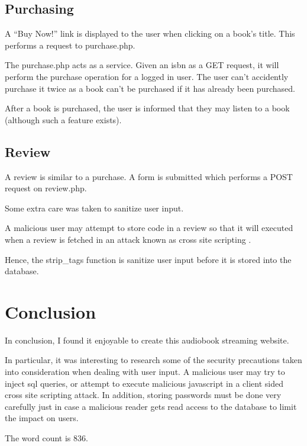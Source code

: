 \documentclass{article}
\begin{document}
\subsection{Purchasing}

A ``Buy Now!'' link is displayed to the user when clicking on a book's title. This performs a request to purchase.php.

The purchase.php acts as a service. Given an isbn as a GET request, it will perform the purchase operation for a logged in user. The user can't accidently purchase it twice as a book can't be purchased if it has already been purchased.

After a book is purchased, the user is informed that they may listen to a book (although such a feature exists).

\subsection{Review}

A review is similar to a purchase. A form is submitted which performs a POST request on review.php.

Some extra care was taken to sanitize user input.

A malicious user may attempt to store code in a review so that it will executed when a review is fetched in an attack known as cross site scripting \cite{owasp-xss}.

Hence, the strip\_tags function is sanitize user input before it is stored into the database.

\section{Conclusion}

In conclusion, I found it enjoyable to create this audiobook streaming website.

In particular, it was interesting to research some of the security precautions taken into consideration when dealing with user input. A malicious user may try to inject sql queries, or attempt to execute malicious javascript in a client sided cross site scripting attack. In addition, storing passwords must be done very carefully just in case a malicious reader gets read access to the database to limit the impact on users.

The word count is 836.
\end{document}
